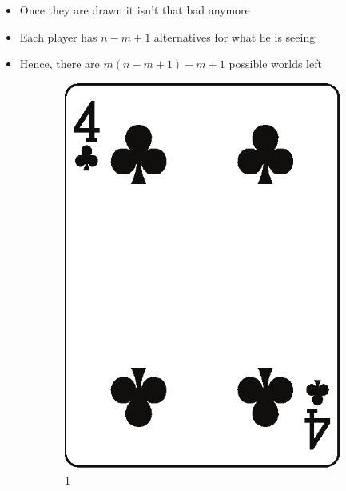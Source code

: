 \documentclass[10pt]{beamer}
\begin{document}
\begin{frame}
\begin{columns}
  \begin{column}{7cm}
    \begin{itemize}[label=$\clubsuit$]
      \item Once they are drawn it isn't that bad anymore
      \item Each player has $n-m+1$ alternatives for what he is seeing
      \item Hence, there are $m(n-m+1) -m + 1$ possible worlds left
    \end{itemize}
    \begin{figure}
     \begin{subfigure}{.15\linewidth}
      \includegraphics[width=\linewidth]{im/clubs_4.eps}
      \caption{1}
     \end{subfigure}
     \begin{subfigure}{.15\linewidth}

\end{subfigure}
\end{figure}
\end{column}
\end{columns}
\end{frame}
\end{document}
